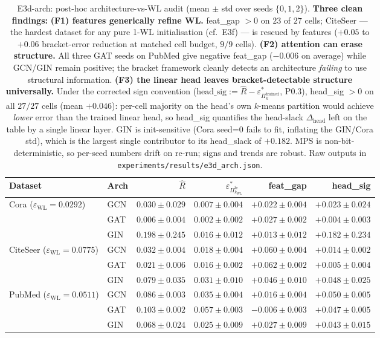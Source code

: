 \documentclass[10pt]{article}
\theoremstyle{definition}
\theoremstyle{remark}
\newcommand{\eps}{\varepsilon}
\begin{document}
\begin{table}[h]\centering\small
\begin{tabular}{llrrrr}
\toprule
Dataset & Arch & $\hat R$ & $\eps^{*}_{\Pi^{\mathrm{tr}}_{k_{\mathrm{WL}}}}$ & feat\_gap & head\_sig \\
\midrule
Cora ($\eps_{\mathrm{WL}}{=}0.0292$)
 & GCN & $0.030{\pm}0.029$ & $0.007{\pm}0.004$ & $+0.022{\pm}0.004$ & $+0.023{\pm}0.024$ \\
 & GAT & $0.006{\pm}0.004$ & $0.002{\pm}0.002$ & $+0.027{\pm}0.002$ & $+0.004{\pm}0.003$ \\
 & GIN & $0.198{\pm}0.245$ & $0.016{\pm}0.012$ & $+0.013{\pm}0.012$ & $+0.182{\pm}0.234$ \\
\midrule
CiteSeer ($\eps_{\mathrm{WL}}{=}0.0775$)
 & GCN & $0.032{\pm}0.004$ & $0.018{\pm}0.004$ & $+0.060{\pm}0.004$ & $+0.014{\pm}0.002$ \\
 & GAT & $0.021{\pm}0.006$ & $0.016{\pm}0.002$ & $+0.062{\pm}0.002$ & $+0.005{\pm}0.004$ \\
 & GIN & $0.079{\pm}0.035$ & $0.031{\pm}0.010$ & $+0.046{\pm}0.010$ & $+0.048{\pm}0.025$ \\
\midrule
PubMed ($\eps_{\mathrm{WL}}{=}0.0511$)
 & GCN & $0.086{\pm}0.003$ & $0.035{\pm}0.004$ & $+0.016{\pm}0.004$ & $+0.050{\pm}0.005$ \\
 & GAT & $0.103{\pm}0.002$ & $0.057{\pm}0.003$ & $-0.006{\pm}0.003$ & $+0.047{\pm}0.005$ \\
 & GIN & $0.068{\pm}0.024$ & $0.025{\pm}0.009$ & $+0.027{\pm}0.009$ & $+0.043{\pm}0.015$ \\
\bottomrule
\end{tabular}
\caption{E3d-arch: post-hoc architecture-vs-WL audit (mean $\pm$
std over seeds $\{0,1,2\}$). \textbf{Three clean findings:}
\textbf{(F1) features generically refine WL.} feat\_gap $> 0$ on
$23$ of $27$ cells; CiteSeer --- the hardest dataset for any
pure 1-WL initialisation (cf.~E3f) --- is rescued by features
($+0.05$ to $+0.06$ bracket-error reduction at matched cell
budget, $9/9$ cells). \textbf{(F2) attention can erase
structure.} All three GAT seeds on PubMed give negative
feat\_gap ($-0.006$ on average) while GCN/GIN remain positive;
the bracket framework cleanly detects an architecture
\emph{failing} to use structural information. \textbf{(F3) the
linear head leaves bracket-detectable structure universally.}
Under the corrected sign convention
($\text{head\_sig} := \hat R - \eps^{*}_{\Pi^{\mathrm{trained}}_{k}}$,
P0.3),
head\_sig $> 0$ on all $27/27$ cells (mean $+0.046$): per-cell
majority on the head's own $k$-means partition would achieve
\emph{lower} error than the trained linear head, so head\_sig
quantifies the head-slack $\Delta_{\mathrm{head}}$ left on the
table by a single linear layer. GIN is init-sensitive (Cora
seed=0 fails to fit, inflating the GIN/Cora std), which is the
largest single contributor to its head\_slack of $+0.182$. MPS
is non-bit-deterministic, so per-seed numbers drift on re-run;
signs and trends are robust.
Raw outputs in \texttt{experiments/results/e3d\_arch.json}.}
\label{tab:e3d-arch}
\end{table}
\end{document}

